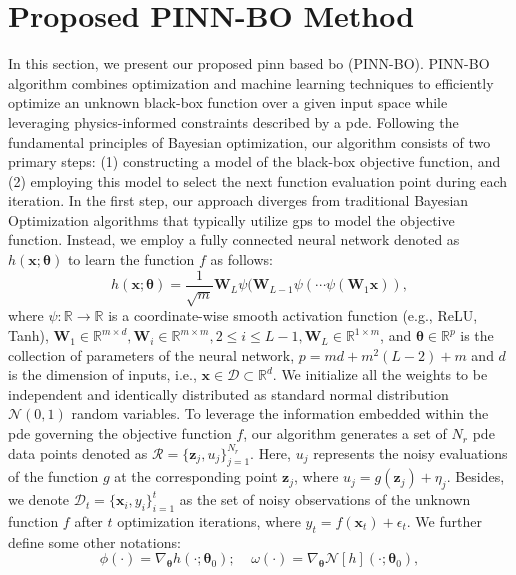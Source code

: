 \section{Proposed PINN-BO Method}
\label{section:pinn-bo_proposed_method}
In this section, we present our proposed \ac{pinn} based \acl{bo} (PINN-BO). PINN-BO algorithm combines optimization and machine learning techniques to efficiently optimize an unknown black-box function over a given input space while leveraging physics-informed constraints described by a \ac{pde}. Following the fundamental principles of Bayesian optimization, our algorithm consists of two primary steps: (1) constructing a model of the black-box objective function, and (2) employing this model to select the next function evaluation point during each iteration. In the first step, our approach diverges from traditional Bayesian Optimization algorithms that typically utilize \acfp{gp} to model the objective function. Instead, we employ a fully connected neural network denoted as $h(\mathbf{x}; \boldsymbol{\theta})$ to learn the function $f$ as follows:
\[
h(\mathbf{x};\boldsymbol{\theta}) = \frac{1}{\sqrt{m}} \mathbf{W}_L \psi(\mathbf{W}_{L-1}\psi(\cdots \psi(\mathbf{W}_1 \mathbf{x})),
\]
where $\psi\colon \mathbb{R} \rightarrow \mathbb{R}$ is a coordinate-wise smooth activation function (e.g., ReLU, Tanh), $\mathbf{W}_1 \in \mathbb{R}^{m \times d}, \mathbf{W}_i \in \mathbb{R}^{m \times m}, 2\leq i \leq L-1, \mathbf{W}_L \in \mathbb{R}^{1 \times m}$, and $\boldsymbol{\theta} \in \mathbb{R}^p$ is the collection of parameters of the neural network, $p=md+m^2(L-2)+m$ and $d$ is the dimension of inputs, i.e., $\mathbf{x} \in \mathcal{D} \subset \mathbb{R}^d$. We initialize all the weights to be independent and identically distributed as standard normal distribution $\mathcal{N}(0,1)$ random variables. To leverage the information embedded within the \ac{pde} governing the objective function $f$, our algorithm generates a set of $N_r$ \ac{pde} data points denoted as $\mathcal{R} =  \{\mathbf{z}_j, u_j\}_{j=1}^{N_r}$. Here, $u_j$ represents the noisy evaluations of the function $g$ at the corresponding point $\mathbf{z}_j$, where $u_j = g(\mathbf{z}_j) + \eta_j$. Besides, we denote $\mathcal{D}_t = \{\mathbf{x}_i, y_i\}_{i=1}^t$ as the set of noisy observations of the unknown function $f$ after $t$ optimization iterations, where $y_t = f(\mathbf{x}_t) + \epsilon_t$. We further define some other notations:
\begin{equation*}
        \phi(\cdot) = \nabla_{\boldsymbol{\theta}} h(\cdot; \boldsymbol{\theta}_0) ; \; \; \; \;
        \omega(\cdot)  = \nabla_{\boldsymbol{\theta}} \mathcal{N}[h] (\cdot; \boldsymbol{\theta}_0),
\end{equation*}
